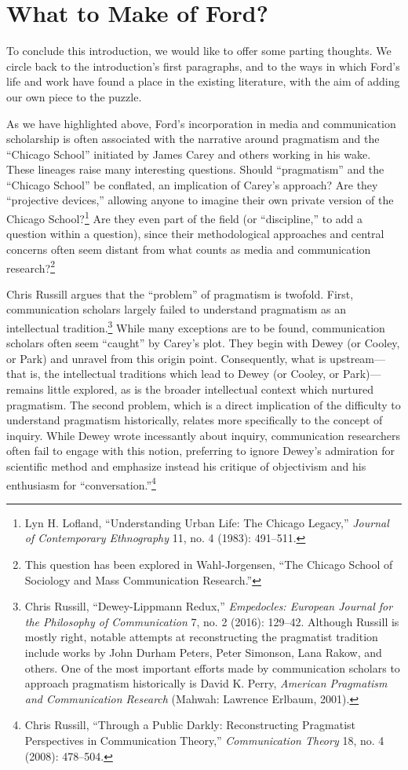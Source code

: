 \documentclass[openany,nobib]{tufte-book}
\begin{document}
\hypertarget{what-to-make-of-ford}{%
\section{What to Make of Ford?}\label{what-to-make-of-ford}}

To conclude this introduction, we would like to offer some parting
thoughts. We circle back to the introduction's first paragraphs, and to
the ways in which Ford's life and work have found a place in the
existing literature, with the aim of adding our own piece to the puzzle.

As we have highlighted above, Ford's incorporation in media and
communication scholarship is often associated with the narrative around
pragmatism and the ``Chicago School'' initiated by James Carey and
others working in his wake. These lineages raise many interesting
questions. Should ``pragmatism'' and the ``Chicago School'' be
conflated, an implication of Carey's approach? Are they ``projective
devices,'' allowing anyone to imagine their own private version of the
Chicago School?\footnote{Lyn H. Lofland, ``Understanding Urban Life: The
  Chicago Legacy,'' \emph{Journal of Contemporary Ethnography} 11, no. 4
  (1983): 491--511.} Are they even part of the field (or ``discipline,''
to add a question within a question), since their methodological
approaches and central concerns often seem distant from what counts as
media and communication research?\footnote{This question has been
  explored in Wahl-Jorgensen, ``The Chicago School of Sociology and Mass
  Communication Research.''}

Chris Russill argues that the ``problem'' of pragmatism is twofold.
First, communication scholars largely failed to understand pragmatism as
an intellectual tradition.\footnote{Chris Russill, ``Dewey-Lippmann
  Redux,'' \emph{Empedocles: European Journal for the Philosophy of
  Communication} 7, no. 2 (2016): 129--42. Although Russill is mostly
  right, notable attempts at reconstructing the pragmatist tradition
  include works by John Durham Peters, Peter Simonson, Lana Rakow, and
  others. One of the most important efforts made by communication
  scholars to approach pragmatism historically is David K. Perry,
  \emph{American Pragmatism and Communication Research} (Mahwah:
  Lawrence Erlbaum, 2001).} While many exceptions are to be found,
communication scholars often seem ``caught'' by Carey's plot. They begin
with Dewey (or Cooley, or Park) and unravel from this origin point.
Consequently, what is upstream---that is, the intellectual traditions
which lead to Dewey (or Cooley, or Park)---remains little explored, as
is the broader intellectual context which nurtured pragmatism. The
second problem, which is a direct implication of the difficulty to
understand pragmatism historically, relates more specifically to the
concept of inquiry. While Dewey wrote incessantly about inquiry,
communication researchers often fail to engage with this notion,
preferring to ignore Dewey's admiration for scientific method and
emphasize instead his critique of objectivism and his enthusiasm for
``conversation.''\footnote{Chris Russill, ``Through a Public Darkly:
  Reconstructing Pragmatist Perspectives in Communication Theory,''
  \emph{Communication Theory} 18, no. 4 (2008): 478--504.}
\end{document}
